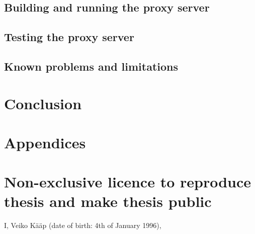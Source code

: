 \documentclass{style/bachelor-thesis}
\begin{document}
\subsection{Building and running the proxy server}
\label{sec:impl_buildrun}


\subsection{Testing the proxy server}
\label{sec:impl_test}


\subsection{Known problems and limitations}
\label{sec:impl_limitations}


\clearpage
\section{Conclusion} 



\newpage

{}


\newpage

\appendix
\section*{Appendices}
\renewcommand{\thesubsection}{\Alph{subsection}}

\pagebreak
\section*{\small Non-exclusive licence to reproduce thesis and make thesis public}


I, Veiko Kääp (date of birth: 4th of January 1996),
\end{document}
